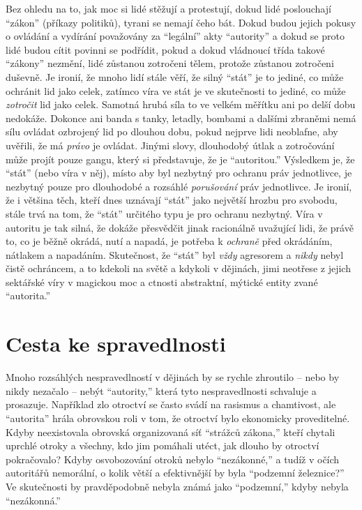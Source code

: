\documentclass{book}
\begin{document}
Bez ohledu na to, jak moc si lidé stěžují a protestují, dokud lidé poslouchají \enquote{zákon} (příkazy politiků), tyrani se nemají čeho bát. Dokud budou jejich pokusy o ovládání a vydírání považovány za \enquote{legální} akty \enquote{autority} a dokud se proto lidé budou cítit povinni se podřídit, pokud a dokud vládnoucí třída takové \enquote{zákony} nezmění, lidé zůstanou zotročeni tělem, protože zůstanou zotročeni duševně. Je ironií, že mnoho lidí stále věří, že silný \enquote{stát} je to jediné, co může ochránit lid jako celek, zatímco víra ve stát je ve skutečnosti to jediné, co může \emph{zotročit} lid jako celek. Samotná hrubá síla to ve velkém měřítku ani po delší dobu nedokáže. Dokonce ani banda s tanky, letadly, bombami a dalšími zbraněmi nemá sílu ovládat ozbrojený lid po dlouhou dobu, pokud nejprve lidi neoblafne, aby uvěřili, že má \emph{právo} je ovládat. Jinými slovy, dlouhodobý útlak a zotročování může projít pouze gangu, který si představuje, že je \enquote{autoritou.} Výsledkem je, že \enquote{stát} (nebo víra v něj), místo aby byl nezbytný pro ochranu práv jednotlivce, je nezbytný pouze pro dlouhodobé a rozsáhlé \emph{porušování} práv jednotlivce. Je ironií, že i většina těch, kteří dnes uznávají \enquote{stát} jako největší hrozbu pro svobodu, stále trvá na tom, že \enquote{stát} určitého typu je pro ochranu nezbytný. Víra v autoritu je tak silná, že dokáže přesvědčit jinak racionálně uvažující lidi, že právě to, co je běžně okrádá, nutí a napadá, je potřeba k \emph{ochraně} před okrádáním, nátlakem a napadáním. Skutečnost, že \enquote{stát} byl \emph{vždy} agresorem a \emph{nikdy} nebyl čistě ochráncem, a to kdekoli na světě a kdykoli v dějinách, jimi neotřese z jejich sektářské víry v magickou moc a ctnosti abstraktní, mýtické entity zvané \enquote{autorita.}

\section{Cesta ke spravedlnosti}

Mnoho rozsáhlých nespravedlností v dějinách by se rychle zhroutilo -- nebo by nikdy nezačalo -- nebýt \enquote{autority,} která tyto nespravedlnosti schvaluje a prosazuje. Například zlo otroctví se často svádí na rasismus a chamtivost, ale \enquote{autorita} hrála obrovskou roli v tom, že otroctví bylo ekonomicky proveditelné. Kdyby neexistovala obrovská organizovaná síť \enquote{strážců zákona,} kteří chytali uprchlé otroky a všechny, kdo jim pomáhali utéct, jak dlouho by otroctví pokračovalo? Kdyby osvobozování otroků nebylo \enquote{nezákonné,} a tudíž v očích autoritářů nemorální, o kolik větší a efektivnější by byla \enquote{podzemní železnice?} Ve skutečnosti by pravděpodobně nebyla známá jako \enquote{podzemní,} kdyby nebyla \enquote{nezákonná.}
\end{document}
